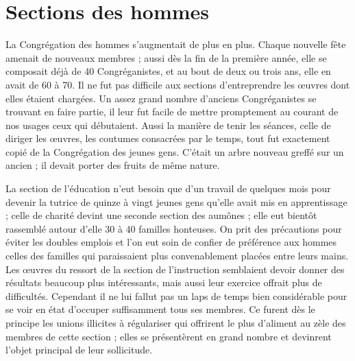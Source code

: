 \section*{Sections des hommes}
La Congrégation des hommes s'augmentait de plus en plus. Chaque nouvelle fête amenait de nouveaux membres ; aussi dès la fin de la première année, elle se composait déjà de 40 Congréganistes, et au bout de deux ou trois ans, elle en avait de 60 à 70. Il ne fut pas difficile aux sections d'entreprendre les œuvres dont elles étaient chargées. Un assez grand nombre d'anciens Congréganistes se trouvant en faire partie, il leur fut facile de mettre promptement au courant de nos usages ceux qui débutaient. Aussi la manière de tenir les séances, celle de diriger les œuvres, les coutumes consacrées par le temps, tout fut exactement copié de la Congrégation des jeunes gens. C'était un arbre nouveau greffé sur un ancien ; il devait porter des fruits de même nature.

La section de l'éducation n'eut besoin que d'un travail de quelques mois pour devenir la tutrice de quinze à vingt jeunes gens qu'elle avait mis en apprentissage ; celle de charité devint une seconde section des aumônes ; elle eut bientôt rassemblé autour d'elle 30 à 40 familles honteuses. On prit des précautions pour éviter les doubles emplois et l'on eut soin de confier de préférence aux hommes celles des familles qui paraissaient plus convenablement placées entre leurs mains. Les œuvres du ressort de la section de l'instruction semblaient devoir donner des résultats beaucoup plus intéressants, mais aussi leur exercice offrait plus de difficultés. Cependant il ne lui fallut pas un laps de temps bien considérable pour se voir en état d'occuper suffisamment tous ses membres. Ce furent dès le principe les unions illicites à régulariser qui offrirent le plus d'aliment au zèle des membres
de cette section ; elles se présentèrent en grand nombre et devinrent l'objet principal de leur sollicitude.

